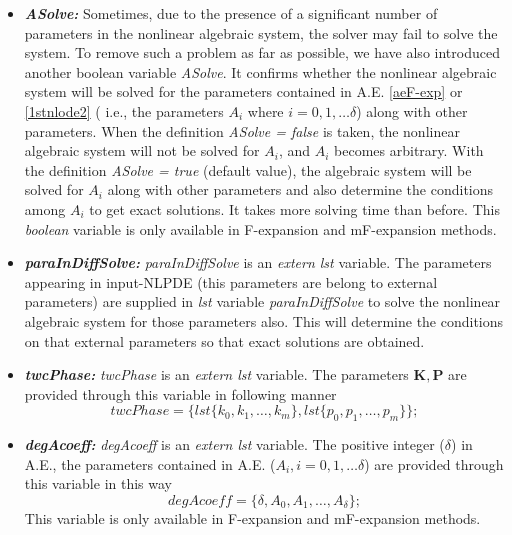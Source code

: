 \documentclass[prd,aps,floats,showkeys,nofootinbib,notitlepage]{revtex4-2}
\begin{document}
\begin{itemize}
		\item[] {\em \textbf{ASolve:}} Sometimes, due to the presence of a significant number of parameters in the nonlinear algebraic system, the solver may fail to solve the system. To remove such a problem as far as possible, we have also introduced another boolean variable {\em ASolve}. It confirms whether the nonlinear algebraic system will be solved for the parameters contained in A.E. \eqref{aeF-exp} or \eqref{1stnlode2} ( i.e., the parameters $A_i$ where $i=0,1,\ldots \delta$) along with other parameters. When the definition {\em ASolve = false} is taken, the nonlinear algebraic system will not be solved for $A_i$, and $A_i$ becomes arbitrary. With the definition {\em ASolve = true} (default value), the algebraic system will be solved for $A_i$ along with other parameters and also determine the conditions among $A_i$ to get exact solutions. It takes more solving time than before. This {\em boolean} variable is only available in F-expansion and mF-expansion methods. 
		
		\item[] {\em \textbf{paraInDiffSolve:}} {\em paraInDiffSolve} is an {\em extern lst} variable. The parameters appearing in input-NLPDE (this parameters are belong to external parameters) are supplied in {\em lst} variable {\em paraInDiffSolve} to solve the nonlinear algebraic system for those parameters also. This will determine the conditions on that external parameters so that exact solutions are obtained.
		
		\item[] {\em \textbf{twcPhase:}} {\em twcPhase} is an {\em extern lst} variable. The parameters $\boldsymbol{K}, \boldsymbol{P}$ are provided through this variable in following manner
		\begin{equation}
			twcPhase = \{lst\{k_0,k_1,\ldots,k_m\},lst\{p_0,p_1,\ldots,p_m\}\};
		\end{equation}
		\item[] {\em \textbf{degAcoeff:}} {\em degAcoeff} is an {\em extern lst} variable. The positive integer ($\delta$) in A.E., the parameters contained in A.E. ($A_i,i=0,1,\ldots\delta$) are provided through this variable in this way
		\begin{equation}
			degAcoeff=\{\delta,A_0,A_1,\ldots,A_\delta\};
		\end{equation}
		This variable is only available in F-expansion and mF-expansion methods.
		

\end{itemize}
\end{document}
